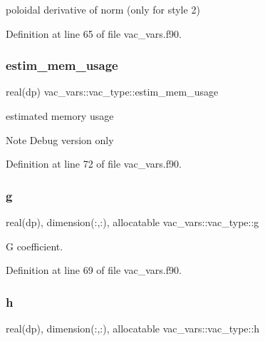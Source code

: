 poloidal derivative of norm (only for style 2) 



Definition at line 65 of file vac\+\_\+vars.\+f90.

\mbox{\label{structvac__vars_1_1vac__type_ab01e7e74ce3f5c2a0e4bff7cd88d5c3f}} 
\subsubsection{\texorpdfstring{estim\+\_\+mem\+\_\+usage}{estim\_mem\_usage}}
{\footnotesize\ttfamily real(dp) vac\+\_\+vars\+::vac\+\_\+type\+::estim\+\_\+mem\+\_\+usage}



estimated memory usage 

\begin{DoxyNote}{Note}
Debug version only 
\end{DoxyNote}


Definition at line 72 of file vac\+\_\+vars.\+f90.

\mbox{\label{structvac__vars_1_1vac__type_abccce7d8c7e44b2bbc76104b2138ea5b}} 
\subsubsection{\texorpdfstring{g}{g}}
{\footnotesize\ttfamily real(dp), dimension(\+:,\+:), allocatable vac\+\_\+vars\+::vac\+\_\+type\+::g}



G coefficient. 



Definition at line 69 of file vac\+\_\+vars.\+f90.

\mbox{\label{structvac__vars_1_1vac__type_a409e9e1182fbfe4cdf9b882297a5faf9}} 
\subsubsection{\texorpdfstring{h}{h}}
{\footnotesize\ttfamily real(dp), dimension(\+:,\+:), allocatable vac\+\_\+vars\+::vac\+\_\+type\+::h}



